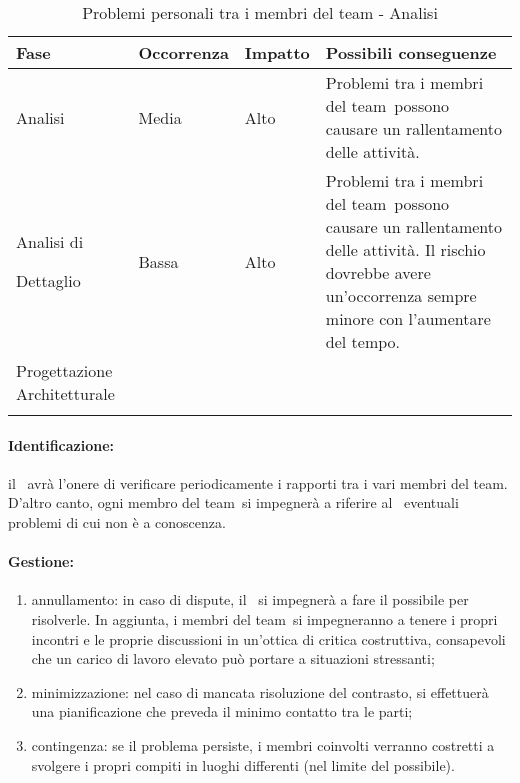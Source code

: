 \documentclass[../PianoProgetto.tex]{subfiles}
\begin{document}
	
	\begin{table}[h]
		\centering
		\begin{tabularx}{\textwidth}{F O O P}
			\toprule
			\textbf{Fase} & \textbf{Occorrenza} & \textbf{Impatto} & \textbf{Possibili conseguenze}\\
			\midrule
			Analisi & Media & Alto & Problemi tra i membri del team\g\ possono causare un rallentamento delle attività. \\
			\midrule
			Analisi di \par Dettaglio & Bassa & Alto & Problemi tra i membri del team\g\ possono causare un rallentamento delle attività. Il rischio dovrebbe avere un'occorrenza sempre minore con l'aumentare del tempo. \\
			\midrule
			Progettazione Architetturale & & & \\
			\bottomrule
		\end{tabularx}
		\caption{Problemi personali tra i membri del team - Analisi}
		\label{tab:Problemi personali tra i membri del team - Analisi}	
	\end{table}
	
	\paragraph*{Identificazione:} il \responsabilediprogetto\ avrà l'onere di verificare periodicamente i rapporti tra i vari membri del team\g. D'altro canto, ogni membro del team\g\ si impegnerà a riferire al \responsabilediprogetto\ eventuali problemi di cui non è a conoscenza.
	
	\paragraph*{Gestione:}
	\begin{enumerate}
		\item annullamento: in caso di dispute, il \responsabilediprogetto\ si impegnerà a fare il possibile per risolverle. In aggiunta, i membri del team\g\ si impegneranno a tenere i propri incontri e le proprie discussioni in un'ottica di critica costruttiva, consapevoli che un carico di lavoro elevato può portare a situazioni stressanti;
		\item minimizzazione: nel caso di mancata risoluzione del contrasto, si effettuerà una pianificazione che preveda il minimo contatto tra le parti; 
		\item contingenza: se il problema persiste, i membri coinvolti verranno costretti a svolgere i propri compiti in luoghi differenti (nel limite del possibile).
	\end{enumerate}	
	
\end{document}
